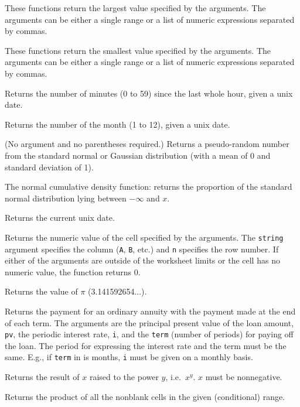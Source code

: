 \documentclass[titlepage]{article}
\begin{document}

  These functions return the largest value
specified by the arguments.  The arguments can be either a single
range or a list of numeric expressions separated by commas.


  These functions return the smallest value
specified by the arguments.  The arguments can be either a single
range or a list of numeric expressions separated by commas.

 Returns the number of minutes (0 to 59)
since the last whole hour, given a unix date.

 Returns the number of the month (1 to 12),
given a unix date.

 (No argument and no parentheses required.)  Returns a
pseudo-random number from the standard normal or Gaussian distribution
(with a mean of 0 and standard deviation of 1).

  The normal cumulative density function: returns
the proportion of the standard normal distribution lying between
$-\infty$ and $x$.

 Returns the current unix date.

 Returns the numeric value of the cell
specified by the arguments.  The \texttt{string} argument specifies
the column (\texttt{A}, \texttt{B}, etc.) and \texttt{n} specifies the
row number.  If either of the arguments are outside of the worksheet
limits or the cell has no numeric value, the function returns 0.
 
 Returns the value of $\pi$
(3.141592654...).

 Returns the payment for an ordinary annuity
with the payment made at the end of each term.  The arguments are the
principal present value of the loan amount, \texttt{pv}, the periodic
interest rate, \texttt{i}, and the \texttt{term} (number of periods)
for paying off the loan.  The period for expressing the interest rate
and the term must be the same.  E.g., if \texttt{term} in is months,
\texttt{i} must be given on a monthly basis.

 Returns the result of $x$ raised to the power $y$,
i.e.\  $x^y$.  $x$ must be nonnegative.

 Returns the product of all the nonblank cells
in the given (conditional) range.
\end{document}
